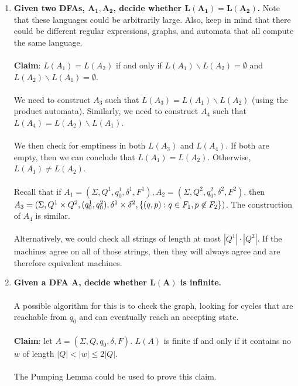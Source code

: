 \documentclass[]{article}
\DeclarePairedDelimiter{\set}{\lbrace}{\rbrace}
\theoremstyle{definition}
\begin{document}
\begin{enumerate}
          \item \textbf{Given two DFAs, $\boldsymbol{A_1, A_2}$, decide whether $\boldsymbol{L(A_1) = L(A_2)}$.} Note that these languages could be arbitrarily large. Also, keep in mind that there could be different regular expressions, graphs, and automata that all compute the same language.
          \\ \\
          \textbf{Claim}: $L(A_1) = L(A_2)$ if and only if $L(A_1) \backslash L(A_2) = \emptyset$ and $L(A_2) \backslash L(A_1) = \emptyset$.
          \\ \\
          We need to construct $A_3$ such that $L(A_3) = L(A_1) \backslash L(A_2)$ (using the product automata). Similarly, we need to construct $A_4$ such that $L(A_4) = L(A_2) \backslash L(A_1)$.
          \\ \\
          We then check for emptiness in both $L(A_3)$ and $L(A_4)$. If both are empty, then we can conclude that $L(A_1) = L(A_2)$. Otherwise, $L(A_1) \ne L(A_2)$.
          \\ \\
          Recall that if $A_1 = (\Sigma, Q^1, q_0^1, \delta^1, F^1), A_2 = (\Sigma, Q^2, q_0^2, \delta^2, F^2)$, then $A_3 = (\Sigma, Q^1 \times Q^2, (q_0^1, q_0^2), \delta^1 \times \delta^2, \set{ (q, p) : q \in F_1, p \not \in F_2 })$. The construction of $A_4$ is similar.
          \\ \\
          Alternatively, we could check all strings of length at most $|Q^1| \cdot |Q^2|$. If the machines agree on all of those strings, then they will always agree and are therefore equivalent machines.

          \item \textbf{Given a DFA $\boldsymbol{A}$, decide whether $\boldsymbol{L(A)}$ is infinite.}
          \\ \\
          A possible algorithm for this is to check the graph, looking for cycles that are reachable from $q_0$ and can eventually reach an accepting state.
          \\ \\
          \textbf{Claim}: let $A = (\Sigma, Q, q_0, \delta, F)$. $L(A)$ is finite if and only if it contains no $w$ of length $|Q| < |w| \le 2|Q|$.
          \\ \\
          The Pumping Lemma could be used to prove this claim.
        \end{enumerate}
\end{document}
